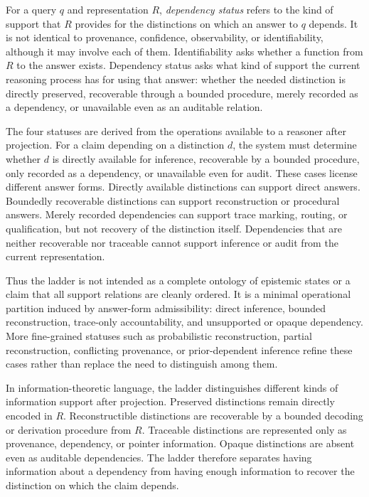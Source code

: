 \documentclass[11pt]{article}
\begin{document}
For a query $q$ and representation $R$, \emph{dependency status} refers to the kind of support that $R$ provides for the distinctions on which an answer to $q$ depends. It is not identical to provenance, confidence, observability, or identifiability, although it may involve each of them. Identifiability asks whether a function from $R$ to the answer exists. Dependency status asks what kind of support the current reasoning process has for using that answer: whether the needed distinction is directly preserved, recoverable through a bounded procedure, merely recorded as a dependency, or unavailable even as an auditable relation.

The four statuses are derived from the operations available to a reasoner after projection. For a claim depending on a distinction $d$, the system must determine whether $d$ is directly available for inference, recoverable by a bounded procedure, only recorded as a dependency, or unavailable even for audit. These cases license different answer forms. Directly available distinctions can support direct answers. Boundedly recoverable distinctions can support reconstruction or procedural answers. Merely recorded dependencies can support trace marking, routing, or qualification, but not recovery of the distinction itself. Dependencies that are neither recoverable nor traceable cannot support inference or audit from the current representation.

Thus the ladder is not intended as a complete ontology of epistemic states or a claim that all support relations are cleanly ordered. It is a minimal operational partition induced by answer-form admissibility: direct inference, bounded reconstruction, trace-only accountability, and unsupported or opaque dependency. More fine-grained statuses such as probabilistic reconstruction, partial reconstruction, conflicting provenance, or prior-dependent inference refine these cases rather than replace the need to distinguish among them.

In information-theoretic language, the ladder distinguishes different kinds of information support after projection. Preserved distinctions remain directly encoded in $R$. Reconstructible distinctions are recoverable by a bounded decoding or derivation procedure from $R$. Traceable distinctions are represented only as provenance, dependency, or pointer information. Opaque distinctions are absent even as auditable dependencies. The ladder therefore separates having information about a dependency from having enough information to recover the distinction on which the claim depends.
\end{document}
